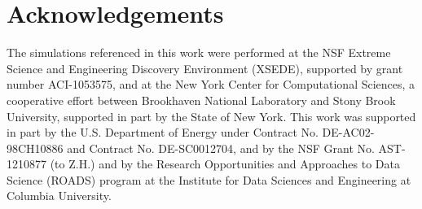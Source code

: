 \documentclass[reprint,aps,prd,superscriptaddress,showkeys,showpacs]{revtex4-1}
\begin{document}
 

\section*{Acknowledgements}
The simulations referenced in this work were performed at the NSF Extreme Science and Engineering Discovery Environment (XSEDE), supported by grant number ACI-1053575, and at the New York Center for Computational Sciences, a cooperative effort between Brookhaven National Laboratory and Stony Brook University, supported in part by the State of New York. This work was supported in part by the U.S. Department of Energy under Contract No. DE-AC02-98CH10886 and Contract No. DE-SC0012704, and by the NSF Grant No. AST-1210877 (to Z.H.) and by the Research Opportunities and Approaches to Data Science (ROADS) program at the Institute for Data Sciences and Engineering at Columbia University.


\label{lastpage}
\end{document}
